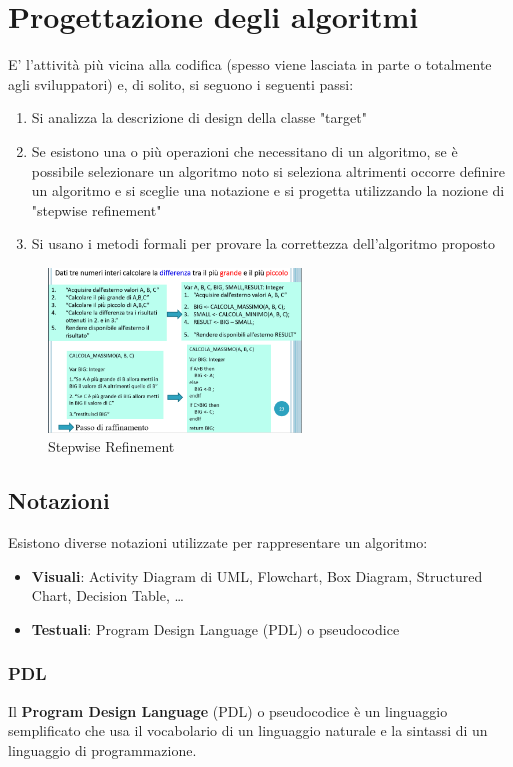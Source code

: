 \documentclass[12pt, a4paper]{report}
\begin{document}
\section{Progettazione degli algoritmi}
E' l'attività più vicina alla codifica (spesso viene lasciata in parte o totalmente agli sviluppatori) e, di solito, si seguono i seguenti passi:
\begin{enumerate}
    \item Si analizza la descrizione di design della classe "target"
    \item Se esistono una o più operazioni che necessitano di un algoritmo, se  è possibile selezionare un algoritmo noto si seleziona altrimenti occorre definire un algoritmo e si sceglie una notazione e si progetta utilizzando la nozione di "stepwise refinement"
    \item Si usano i metodi formali per provare la correttezza dell'algoritmo proposto
\end{enumerate}
\begin{figure}[h]
    \centering
    \includegraphics[width=0.6\textwidth]{Immagini/stepwiserefinement.png}
    \caption{Stepwise Refinement}
\end{figure}
\subsection{Notazioni}
Esistono diverse notazioni utilizzate per rappresentare un algoritmo:
\begin{itemize}
    \item \textbf{Visuali}: Activity Diagram di UML, Flowchart, Box Diagram, Structured Chart, Decision Table, \ldots
    \item \textbf{Testuali}:  Program Design Language (PDL) o pseudocodice
\end{itemize}
\subsubsection{PDL}
Il \textbf{Program Design Language} (PDL) o pseudocodice è un linguaggio semplificato che usa il vocabolario di un linguaggio naturale e la sintassi di un linguaggio di programmazione.
\end{document}
